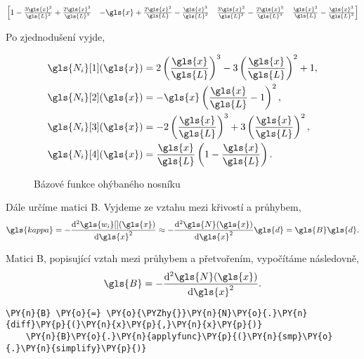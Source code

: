                 
    
    $\displaystyle \left[\begin{matrix}1 - \frac{3 \gls{x}^{2}}{\gls{L}^{2}} + \frac{2 \gls{x}^{3}}{\gls{L}^{3}} & - \gls{x} + \frac{2 \gls{x}^{2}}{\gls{L}} - \frac{\gls{x}^{3}}{\gls{L}^{2}} & \frac{3 \gls{x}^{2}}{\gls{L}^{2}} - \frac{2 \gls{x}^{3}}{\gls{L}^{3}} & \frac{\gls{x}^{2}}{\gls{L}} - \frac{\gls{x}^{3}}{\gls{L}^{2}}\end{matrix}\right]$

\vspace{0.3cm}

Po zjednodušení vyjde,

\begin{align}
    \gls{N_i}[1] (\gls{x}) &= 2 \left( \frac{\gls{x}}{\gls{L}} \right)^3 - 3 \left( \frac{\gls{x}}{\gls{L}} \right)^2 + 1, \\
    \gls{N_i}[2] (\gls{x}) & = - \gls{x} \left( \frac{\gls{x}}{\gls{L}} - 1\right)^2, \\
    \gls{N_i}[3] (\gls{x}) &= - 2 \left( \frac{\gls{x}}{\gls{L}} \right)^3 + 3 \left( \frac{\gls{x}}{\gls{L}} \right)^2, \\
    \gls{N_i}[4] (\gls{x}) &= \frac{\gls{x}}{\gls{L}} \left( 1 - \frac{\gls{x}}{\gls{L}} \right).
\end{align}
                
\begin{figure}[H]
    
    \caption{Bázové funkce ohýbaného nosníku}
    \label{fig:N_1}
\end{figure}


Dále určíme matici \gls{B}. Vyjdeme ze vztahu mezi křivostí a průhybem,
\begin{equation}
    \gls{kappa} = - \dv[2]{\gls{w_i}[ ](\gls{x})}{\gls{x}} \approx  - \dv[2]{\gls{N}(\gls{x})}{\gls{x}} \gls{d} = \gls{B} \gls{d}.
\end{equation}

Matici \gls{B}, popisující vztah mezi průhybem a přetvořením, vypočítáme následovně,
\begin{equation}
    \gls{B} = - \dv[2]{\gls{N}(\gls{x})}{\gls{x}}.
\end{equation}

    
\begin{tcolorbox}[breakable, size=fbox, boxrule=1pt, pad at break*=1mm,colback=cellbackground, colframe=cellborder]
    \begin{Verbatim}[commandchars=\\\{\}]
    \PY{n}{B} \PY{o}{=} \PY{o}{\PYZhy{}}\PY{n}{N}\PY{o}{.}\PY{n}{diff}\PY{p}{(}\PY{n}{x}\PY{p}{,}\PY{n}{x}\PY{p}{)}
    \PY{n}{B}\PY{o}{.}\PY{n}{applyfunc}\PY{p}{(}\PY{n}{smp}\PY{o}{.}\PY{n}{simplify}\PY{p}{)}
    \end{Verbatim}
\end{tcolorbox}
                
